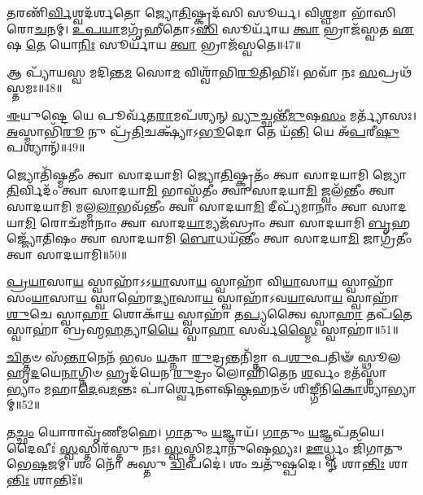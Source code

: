 \-\ul{𑌤}\-𑌰𑌣𑌿᳴\-\ul{𑌰𑍍𑌵𑌿}\-𑌶𑍍𑌵𑌦᳴𑌰𑍍\mbox{}𑌶𑌤𑍋 𑌜𑍍𑌯𑍋\-\ul{𑌤𑌿}\-𑌷𑍍𑌕𑍃𑌦᳴𑌸𑌿 𑌸𑍂𑌰𑍍𑌯। 
𑌵𑌿\-\ul{𑌶𑍍𑌵}\-𑌮𑌾 𑌭𑌾᳴𑌸𑌿 𑌰𑍋\-\ul{𑌚}\-𑌨𑌮𑍍। 
\-\ul{𑌉}\-\-\ul{𑌪}\-\-\ul{𑌯𑌾}\-𑌮𑌗𑍃᳴𑌹𑍀𑌤𑍋𑌽\-\ul{𑌸𑌿} 𑌸𑍂𑌰𑍍𑌯𑌾᳴𑌯 \ul{𑌤𑍍𑌵𑌾} 𑌭𑍍𑌰𑌾𑌜᳴𑌸𑍍𑌵𑌤 \ul{𑌏}\-𑌷 \ul{𑌤𑍇} 𑌯𑍋\-\ul{𑌨𑌿𑌃} 𑌸𑍂𑌰𑍍𑌯𑌾᳴𑌯 \ul{𑌤𑍍𑌵𑌾} 𑌭𑍍𑌰𑌾𑌜᳴𑌸𑍍𑌵𑌤𑍇॥47॥
\anuvakamend

𑌆 𑌪𑍍𑌯𑌾᳴𑌯𑌸𑍍𑌵 𑌮𑌦𑌿𑌨𑍍𑌤\-\ul{𑌮} 𑌸𑍋\-\ul{𑌮} 𑌵𑌿𑌶𑍍𑌵𑌾᳴𑌭𑌿\-\ul{𑌰𑍂}\-𑌤𑌿𑌭𑌿𑌃᳴। 
𑌭𑌵𑌾᳴ 𑌨𑌃 \ul{𑌸}\-𑌪𑍍𑌰𑌥᳴𑌸𑍍𑌤𑌮𑌃॥48॥
\anuvakamend

\-\ul{𑌈}\-𑌯𑍁𑌷𑍍𑌟𑍇 𑌯𑍇 𑌪𑍂𑌰𑍍𑌵᳴𑌤\-\ul{𑌰𑌾}\-𑌮𑌪᳴𑌶𑍍𑌯𑌨𑍍 \ul{𑌵𑍍𑌯𑍁}\-𑌚𑍍𑌛𑌨𑍍𑌤𑍀᳴\-\ul{𑌮𑍁}\-𑌷\-\ul{𑌸𑌂} 𑌮𑌰𑍍𑌤𑍍𑌯𑌾᳴𑌸𑌃। 
\-\ul{𑌅}\-𑌸𑍍𑌮𑌾𑌭𑌿᳴\-\ul{𑌰𑍂} 𑌨𑍁 𑌪𑍍𑌰᳴\-\ul{𑌤𑌿}\-𑌚𑌕𑍍𑌷𑍍𑌯𑌾᳴𑌽\-\ul{𑌭𑍂}\-𑌦𑍋 𑌤𑍇 𑌯᳴\-\ul{𑌨𑍍𑌤𑌿} 𑌯𑍇 𑌅᳴\-\ul{𑌪}\-𑌰𑍀\-\ul{𑌷𑍁} 𑌪𑌶𑍍𑌯𑌾𑌨𑍍᳴॥49॥%
\anuvakamend

𑌜𑍍𑌯𑍋𑌤𑌿᳴𑌷𑍍𑌮𑌤𑍀𑌂 𑌤𑍍𑌵𑌾 𑌸𑌾𑌦𑌯𑌾𑌮𑌿 𑌜𑍍𑌯𑍋\-\ul{𑌤𑌿}\-𑌷𑍍𑌕𑍃𑌤𑌂᳴ 𑌤𑍍𑌵𑌾 𑌸𑌾𑌦𑌯𑌾𑌮𑌿 𑌜𑍍𑌯𑍋\-\ul{𑌤𑌿}\-𑌰𑍍𑌵𑌿𑌦𑌂᳴ 𑌤𑍍𑌵𑌾 𑌸𑌾𑌦𑌯𑌾\-\ul{𑌮𑌿} 𑌭𑌾𑌸𑍍𑌵᳴𑌤𑍀𑌂 𑌤𑍍𑌵𑌾 𑌸𑌾𑌦𑌯𑌾\-\ul{𑌮𑌿} 𑌜𑍍𑌵𑌲᳴𑌨𑍍𑌤𑍀𑌂 𑌤𑍍𑌵𑌾 𑌸𑌾𑌦𑌯𑌾𑌮𑌿 𑌮𑌲𑍍𑌮\-\ul{𑌲𑌾}\-𑌭𑌵᳴𑌨𑍍𑌤𑍀𑌂 𑌤𑍍𑌵𑌾 𑌸𑌾𑌦𑌯𑌾\-\ul{𑌮𑌿} 𑌦𑍀𑌪𑍍𑌯᳴𑌮𑌾𑌨𑌾𑌂 𑌤𑍍𑌵𑌾 𑌸𑌾𑌦𑌯𑌾\-\ul{𑌮𑌿} 𑌰𑍋𑌚᳴𑌮𑌾𑌨𑌾𑌂 𑌤𑍍𑌵𑌾 𑌸𑌾𑌦\-\ul{𑌯𑌾}\-𑌮𑍍𑌯𑌜᳴𑌸𑍍𑌰𑌾𑌂 𑌤𑍍𑌵𑌾 𑌸𑌾𑌦𑌯𑌾𑌮𑌿 \ul{𑌬𑍃}\-𑌹𑌜𑍍𑌜𑍍𑌯𑍋᳴𑌤𑌿𑌷𑌂 𑌤𑍍𑌵𑌾 𑌸𑌾𑌦𑌯𑌾𑌮𑌿 \ul{𑌬𑍋}\-𑌧𑌯᳴𑌨𑍍𑌤𑍀𑌂 𑌤𑍍𑌵𑌾 𑌸𑌾𑌦𑌯𑌾\-\ul{𑌮𑌿} 𑌜𑌾𑌗𑍍𑌰᳴𑌤𑍀𑌂 𑌤𑍍𑌵𑌾 𑌸𑌾𑌦𑌯𑌾𑌮𑌿॥50॥
\anuvakamend

\-\ul{𑌪𑍍𑌰}\-\-\ul{𑌯𑌾}\-𑌸𑌾\-\ul{𑌯} 𑌸𑍍𑌵𑌾𑌹𑌾᳴𑌽𑌽\-\ul{𑌯𑌾}\-𑌸𑌾\-\ul{𑌯} 𑌸𑍍𑌵𑌾𑌹𑌾᳴ 𑌵𑌿\-\ul{𑌯𑌾}\-𑌸𑌾\-\ul{𑌯} 𑌸𑍍𑌵𑌾𑌹𑌾᳴ 𑌸𑌂\-\ul{𑌯𑌾}\-𑌸𑌾\-\ul{𑌯} 𑌸𑍍𑌵𑌾𑌹𑍋॑\-\ul{𑌦𑍍𑌯𑌾}\-𑌸𑌾\-\ul{𑌯} 𑌸𑍍𑌵𑌾𑌹𑌾᳴𑌽𑌵\-\ul{𑌯𑌾}\-𑌸𑌾\-\ul{𑌯} 𑌸𑍍𑌵𑌾𑌹𑌾᳴ \ul{𑌶𑍁}\-𑌚𑍇 𑌸𑍍𑌵𑌾\-\ul{𑌹𑌾} 𑌶𑍋𑌕𑌾᳴\-\ul{𑌯} 𑌸𑍍𑌵𑌾𑌹𑌾᳴ 𑌤\-\ul{𑌪𑍍𑌯}\-𑌤𑍍𑌵𑍈 𑌸𑍍𑌵𑌾\-\ul{𑌹𑌾} 𑌤𑌪᳴\-\ul{𑌤𑍇} 𑌸𑍍𑌵𑌾𑌹𑌾॑ 𑌬𑍍𑌰𑌹𑍍𑌮\-\ul{𑌹}\-𑌤𑍍𑌯𑌾\-\ul{𑌯𑍈} 𑌸𑍍𑌵𑌾\-\ul{𑌹𑌾} 𑌸𑌰𑍍𑌵᳴\-\ul{𑌸𑍍𑌮𑍈} 𑌸𑍍𑌵𑌾𑌹𑌾॑॥51॥%
\anuvakamend

\-\ul{𑌚𑌿}\-𑌤𑍍𑌤𑍞 𑌸᳴\-\ul{𑌨𑍍𑌤𑌾}\-𑌨𑍇𑌨᳴ \ul{𑌭}\-𑌵𑌂 \ul{𑌯}\-𑌕𑍍𑌨𑌾 \ul{𑌰𑍁}\-𑌦𑍍𑌰𑌨𑍍𑌤𑌨𑌿᳴𑌮𑍍𑌨𑌾 𑌪\-\ul{𑌶𑍁}\-𑌪𑌤𑌿𑍟᳴ 𑌸𑍍𑌥𑍂𑌲𑌹𑍃\-\ul{𑌦}\-𑌯𑍇\-\ul{𑌨𑌾}\-𑌗𑍍𑌨𑌿𑍞 𑌹𑍃𑌦᳴𑌯𑍇𑌨 \ul{𑌰𑍁}\-𑌦𑍍𑌰𑌂 𑌲𑍋𑌹𑌿᳴𑌤𑍇𑌨 \ul{𑌶}\-𑌰𑍍𑌵𑌂 𑌮𑌤᳴𑌸𑍍𑌨𑌾𑌭𑍍𑌯𑌾𑌂 𑌮𑌹𑌾\-\ul{𑌦𑍇}\-𑌵\-\ul{𑌮}\-𑌨𑍍𑌤𑌃 𑌪𑌾॑𑌰𑍍𑌶𑍍𑌵𑍇𑌨𑍗𑌷𑌿\-\ul{𑌷𑍍𑌠}\-𑌹𑌨𑍞᳴ 𑌶𑌿𑌙𑍍𑌗𑍀𑌨𑌿\-\ul{𑌕𑍋}\-𑌶𑍍𑌯𑌾॑𑌭𑍍𑌯𑌾𑌮𑍍॥52॥
\anuvakamend

𑌤\-\ul{𑌚𑍍𑌛𑌂} 𑌯𑍋𑌰𑌾𑌵𑍃᳴𑌣𑍀𑌮𑌹𑍇। 
\-\ul{𑌗𑌾}\-𑌤𑍁𑌂 \ul{𑌯}\-𑌜𑍍𑌞𑌾𑌯᳴। 
\-\ul{𑌗𑌾}\-𑌤𑍁𑌂 \ul{𑌯}\-𑌜𑍍𑌞𑌪᳴𑌤𑌯𑍇। 
𑌦𑍈𑌵𑍀𑌃॑ \ul{𑌸𑍍𑌵}\-𑌸𑍍𑌤𑌿𑌰᳴𑌸𑍍𑌤𑍁 𑌨𑌃। 
\-\ul{𑌸𑍍𑌵}\-𑌸𑍍𑌤𑌿𑌰𑍍𑌮𑌾𑌨𑍁᳴𑌷𑍇𑌭𑍍𑌯𑌃। 
\-\ul{𑌊}\-𑌰𑍍𑌧𑍍𑌵𑌂 𑌜𑌿᳴𑌗𑌾𑌤𑍁 𑌭𑍇\-\ul{𑌷}\-𑌜𑌮𑍍। 
𑌶𑌂 𑌨𑍋᳴ 𑌅𑌸𑍍𑌤𑍁 \ul{𑌦𑍍𑌵𑌿}\-𑌪𑌦𑍇॑। 
𑌶𑌂 𑌚𑌤𑍁᳴𑌷𑍍𑌪𑌦𑍇। 
𑍐 𑌶𑌾\-\ul{𑌨𑍍𑌤𑌿𑌃} 𑌶𑌾\-\ul{𑌨𑍍𑌤𑌿𑌃} 𑌶𑌾𑌨𑍍𑌤𑌿𑌃᳴॥

\closesection
\clearpage
